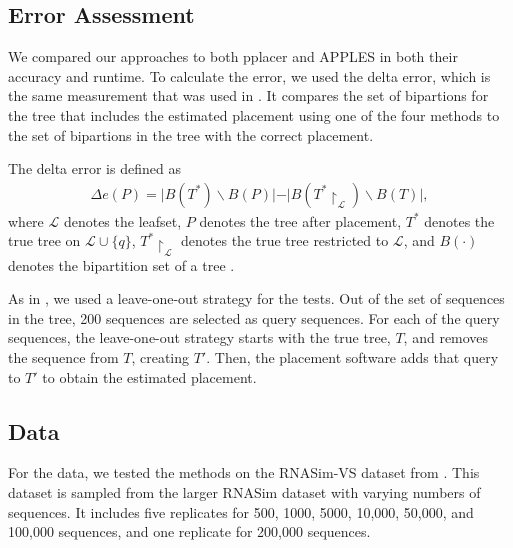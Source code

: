 \documentclass[10pt]{article}
\begin{document}
\subsection{Error Assessment}

We compared our approaches to both pplacer and APPLES in both their accuracy and runtime. To calculate the error, we used the delta error, which is the same measurement that was used in \cite{balaban_apples_2020}. It compares the set of bipartions for the tree that includes the estimated placement using one of the four methods to the set of bipartions in the tree with the correct placement.


The delta error is defined as
\begin{align*}
\Delta e(P) = \vert B(T^*) \backslash B(P) \vert - \vert B(T^* \upharpoonright_{\mathcal L}) \backslash B(T)\vert,
\end{align*}
where $\mathcal L$ denotes the leafset, \(P\) denotes the tree after placement, $T^*$ denotes the true tree on $\mathcal L \cup \{q\}$, $T^* \upharpoonright_{\mathcal L}$ denotes the true tree restricted to $\mathcal L$, and $B(\cdot)$ denotes the bipartition set of a tree \cite{balaban_apples_2020}.

As in \cite{balaban_apples_2020}, we used a leave-one-out strategy for the tests. Out of the set of sequences in the tree, 200 sequences are selected as query sequences. For each of the query sequences, the leave-one-out strategy starts with the true tree, \(T\), and removes the sequence from \(T\), creating \(T'\). Then, the placement software adds that query to \(T'\) to obtain the estimated placement.


\subsection{Data}

For the data, we tested the methods on the RNASim-VS dataset from \cite{balaban_apples_2020}. This dataset is sampled from the larger RNASim dataset with varying numbers of sequences. It includes five replicates for 500, 1000, 5000, 10,000, 50,000, and 100,000 sequences, and one replicate for 200,000 sequences.

\end{document}

